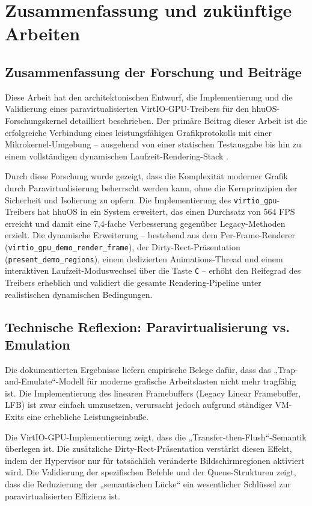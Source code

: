 \chapter{Zusammenfassung und zukünftige Arbeiten}

\section{Zusammenfassung der Forschung und Beiträge}
Diese Arbeit hat den architektonischen Entwurf, die Implementierung und die
Validierung eines paravirtualisierten VirtIO-GPU-Treibers für den
hhuOS-Forschungskernel detailliert beschrieben. Der primäre Beitrag dieser
Arbeit ist die erfolgreiche Verbindung eines leistungsfähigen
Grafikprotokolls mit einer Mikrokernel-Umgebung -- ausgehend von einer
statischen Testausgabe bis hin zu einem vollständigen dynamischen
Laufzeit-Rendering-Stack .

Durch diese Forschung wurde gezeigt, dass die Komplexität moderner Grafik durch
Paravirtualisierung beherrscht werden kann, ohne die Kernprinzipien der
Sicherheit und Isolierung zu opfern. Die Implementierung des
\texttt{virtio\_gpu}-Treibers hat hhuOS in ein System erweitert, das einen
Durchsatz von 564 FPS erreicht und damit eine 7,4-fache Verbesserung gegenüber
Legacy-Methoden erzielt. Die dynamische Erweiterung -- bestehend aus dem
Per-Frame-Renderer (\texttt{virtio\_gpu\_demo\_render\_frame}), der
Dirty-Rect-Präsentation (\texttt{present\_demo\_regions}), einem dedizierten
Animations-Thread und einem interaktiven Laufzeit-Moduswechsel über die Taste
\texttt{C} -- erhöht den Reifegrad des Treibers erheblich und validiert die
gesamte Rendering-Pipeline unter realistischen dynamischen Bedingungen.

\section{Technische Reflexion: Paravirtualisierung vs. Emulation}
Die dokumentierten Ergebnisse liefern empirische Belege dafür, dass das
„Trap-and-Emulate“-Modell für moderne grafische Arbeitslasten nicht mehr
tragfähig ist. Die Implementierung des linearen Framebuffers
(Legacy Linear Framebuffer, LFB) ist zwar einfach umzusetzen, verursacht jedoch
aufgrund ständiger VM-Exits eine erhebliche Leistungseinbuße.

Die VirtIO-GPU-Implementierung zeigt, dass die
„Transfer-then-Flush“-Semantik überlegen ist. Die zusätzliche
Dirty-Rect-Präsentation verstärkt diesen Effekt, indem der Hypervisor nur für
tatsächlich veränderte Bildschirmregionen aktiviert wird. Die Validierung der
spezifischen Befehle und der Queue-Strukturen zeigt, dass die Reduzierung der
„semantischen Lücke“ ein wesentlicher Schlüssel zur paravirtualisierten
Effizienz ist.

